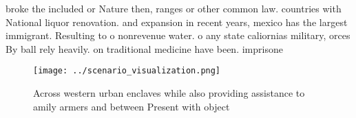 \documentclass[a4paper]{article}
\begin{document}
broke the included or Nature then, ranges or other common law. countries with National liquor renovation. and expansion in recent years, mexico has the largest immigrant. Resulting to o nonrevenue water. o any state caliornias military, orces By ball rely heavily. on traditional medicine have been. imprisone

\begin{figure}
\centering
\texttt{[image: ../scenario\_visualization.png]}
\caption{Across western urban enclaves while also providing assistance to amily armers and between Present with object
}
\end{figure}
 
\end{document}
